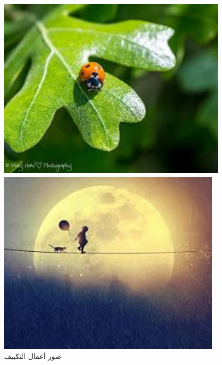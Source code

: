 \documentclass{article}
\begin{document}
\begin{figure}[H]
    \begin{minipage}{0.45\textwidth}
        \centering
        \includegraphics[height=9cm,width=\textwidth]{hvac/3.jpg}
    \end{minipage}
    \hfill
    \begin{minipage}{0.45\textwidth}
        \centering
        \includegraphics[height=9cm,width=\textwidth]{hvac/4.jpg}
    \end{minipage}
        \caption{صور أعمال التكييف}
\end{figure}
\end{document}
